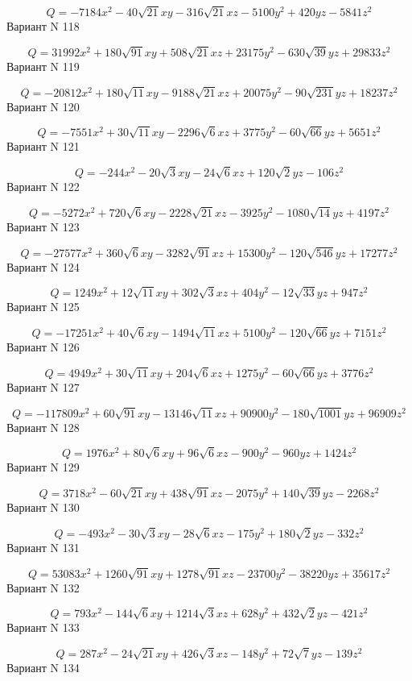 \documentclass[11pt]{report}
\begin{document}
$$Q = - 7184 x^{2} - 40 \sqrt{21} x y - 316 \sqrt{21} x z - 5100 y^{2} + 420 y z - 5841 z^{2}$$Вариант N 118

$$Q = 31992 x^{2} + 180 \sqrt{91} x y + 508 \sqrt{21} x z + 23175 y^{2} - 630 \sqrt{39} y z + 29833 z^{2}$$Вариант N 119

$$Q = - 20812 x^{2} + 180 \sqrt{11} x y - 9188 \sqrt{21} x z + 20075 y^{2} - 90 \sqrt{231} y z + 18237 z^{2}$$Вариант N 120

$$Q = - 7551 x^{2} + 30 \sqrt{11} x y - 2296 \sqrt{6} x z + 3775 y^{2} - 60 \sqrt{66} y z + 5651 z^{2}$$Вариант N 121

$$Q = - 244 x^{2} - 20 \sqrt{3} x y - 24 \sqrt{6} x z + 120 \sqrt{2} y z - 106 z^{2}$$Вариант N 122

$$Q = - 5272 x^{2} + 720 \sqrt{6} x y - 2228 \sqrt{21} x z - 3925 y^{2} - 1080 \sqrt{14} y z + 4197 z^{2}$$Вариант N 123

$$Q = - 27577 x^{2} + 360 \sqrt{6} x y - 3282 \sqrt{91} x z + 15300 y^{2} - 120 \sqrt{546} y z + 17277 z^{2}$$Вариант N 124

$$Q = 1249 x^{2} + 12 \sqrt{11} x y + 302 \sqrt{3} x z + 404 y^{2} - 12 \sqrt{33} y z + 947 z^{2}$$Вариант N 125

$$Q = - 17251 x^{2} + 40 \sqrt{6} x y - 1494 \sqrt{11} x z + 5100 y^{2} - 120 \sqrt{66} y z + 7151 z^{2}$$Вариант N 126

$$Q = 4949 x^{2} + 30 \sqrt{11} x y + 204 \sqrt{6} x z + 1275 y^{2} - 60 \sqrt{66} y z + 3776 z^{2}$$Вариант N 127

$$Q = - 117809 x^{2} + 60 \sqrt{91} x y - 13146 \sqrt{11} x z + 90900 y^{2} - 180 \sqrt{1001} y z + 96909 z^{2}$$Вариант N 128

$$Q = 1976 x^{2} + 80 \sqrt{6} x y + 96 \sqrt{6} x z - 900 y^{2} - 960 y z + 1424 z^{2}$$Вариант N 129

$$Q = 3718 x^{2} - 60 \sqrt{21} x y + 438 \sqrt{91} x z - 2075 y^{2} + 140 \sqrt{39} y z - 2268 z^{2}$$Вариант N 130

$$Q = - 493 x^{2} - 30 \sqrt{3} x y - 28 \sqrt{6} x z - 175 y^{2} + 180 \sqrt{2} y z - 332 z^{2}$$Вариант N 131

$$Q = 53083 x^{2} + 1260 \sqrt{91} x y + 1278 \sqrt{91} x z - 23700 y^{2} - 38220 y z + 35617 z^{2}$$Вариант N 132

$$Q = 793 x^{2} - 144 \sqrt{6} x y + 1214 \sqrt{3} x z + 628 y^{2} + 432 \sqrt{2} y z - 421 z^{2}$$Вариант N 133

$$Q = 287 x^{2} - 24 \sqrt{21} x y + 426 \sqrt{3} x z - 148 y^{2} + 72 \sqrt{7} y z - 139 z^{2}$$Вариант N 134
\end{document}
